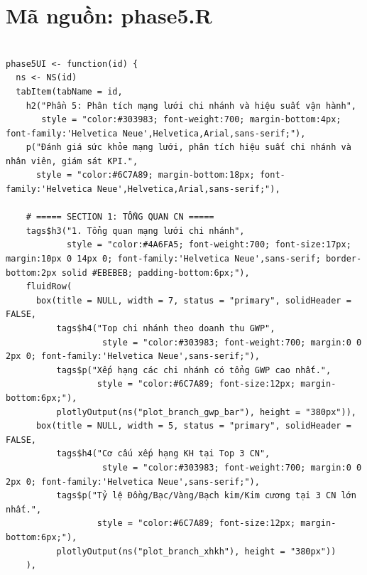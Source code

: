 \documentclass[12pt, a4paper]{article}
\begin{document}
\section{Mã nguồn: phase5.R}
\begin{lstlisting}

phase5UI <- function(id) {
  ns <- NS(id)
  tabItem(tabName = id,
    h2("Phần 5: Phân tích mạng lưới chi nhánh và hiệu suất vận hành",
       style = "color:#303983; font-weight:700; margin-bottom:4px; font-family:'Helvetica Neue',Helvetica,Arial,sans-serif;"),
    p("Đánh giá sức khỏe mạng lưới, phân tích hiệu suất chi nhánh và nhân viên, giám sát KPI.",
      style = "color:#6C7A89; margin-bottom:18px; font-family:'Helvetica Neue',Helvetica,Arial,sans-serif;"),

    # ===== SECTION 1: TỔNG QUAN CN =====
    tags$h3("1. Tổng quan mạng lưới chi nhánh",
            style = "color:#4A6FA5; font-weight:700; font-size:17px; margin:10px 0 14px 0; font-family:'Helvetica Neue',sans-serif; border-bottom:2px solid #EBEBEB; padding-bottom:6px;"),
    fluidRow(
      box(title = NULL, width = 7, status = "primary", solidHeader = FALSE,
          tags$h4("Top chi nhánh theo doanh thu GWP",
                   style = "color:#303983; font-weight:700; margin:0 0 2px 0; font-family:'Helvetica Neue',sans-serif;"),
          tags$p("Xếp hạng các chi nhánh có tổng GWP cao nhất.",
                  style = "color:#6C7A89; font-size:12px; margin-bottom:6px;"),
          plotlyOutput(ns("plot_branch_gwp_bar"), height = "380px")),
      box(title = NULL, width = 5, status = "primary", solidHeader = FALSE,
          tags$h4("Cơ cấu xếp hạng KH tại Top 3 CN",
                   style = "color:#303983; font-weight:700; margin:0 0 2px 0; font-family:'Helvetica Neue',sans-serif;"),
          tags$p("Tỷ lệ Đồng/Bạc/Vàng/Bạch kim/Kim cương tại 3 CN lớn nhất.",
                  style = "color:#6C7A89; font-size:12px; margin-bottom:6px;"),
          plotlyOutput(ns("plot_branch_xhkh"), height = "380px"))
    ),


\end{lstlisting}
\end{document}
